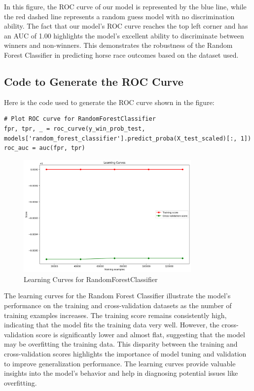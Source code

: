 \documentclass{article}
\begin{document}
In this figure, the ROC curve of our model is represented by the blue line, while the red dashed line represents a random guess model with no discrimination ability. The fact that our model's ROC curve reaches the top left corner and has an AUC of 1.00 highlights the model's excellent ability to discriminate between winners and non-winners. This demonstrates the robustness of the Random Forest Classifier in predicting horse race outcomes based on the dataset used.


\subsection*{Code to Generate the ROC Curve}

Here is the code used to generate the ROC curve shown in the figure:

\begin{verbatim}
# Plot ROC curve for RandomForestClassifier
fpr, tpr, _ = roc_curve(y_win_prob_test, models['random_forest_classifier'].predict_proba(X_test_scaled)[:, 1])
roc_auc = auc(fpr, tpr)
\end{verbatim}


\begin{figure}[H]
    \centering
    \includegraphics[width=0.8\textwidth]{images/learning_curves.png} %
    \caption{Learning Curves for RandomForestClassifier}
    \label{fig:learning_curves}
\end{figure}

The learning curves for the Random Forest Classifier illustrate the model's performance on the training and cross-validation datasets as the number of training examples increases. The training score remains consistently high, indicating that the model fits the training data very well. However, the cross-validation score is significantly lower and almost flat, suggesting that the model may be overfitting the training data. This disparity between the training and cross-validation scores highlights the importance of model tuning and validation to improve generalization performance. The learning curves provide valuable insights into the model's behavior and help in diagnosing potential issues like overfitting.
\end{document}
